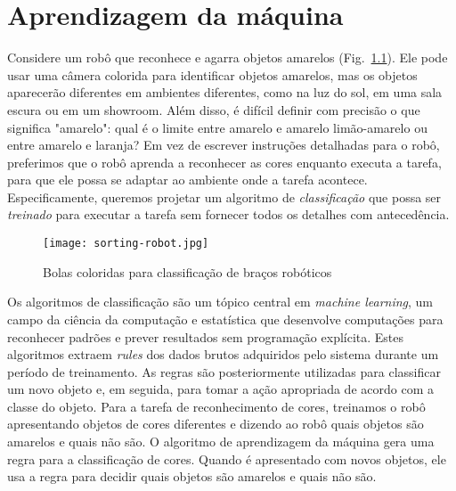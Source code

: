 
\chapter{Aprendizagem da máquina}\label{ch.machine}

Considere um robô que reconhece e agarra objetos amarelos (Fig.~\ref{fig.sortballs}). Ele pode usar uma câmera colorida para identificar objetos amarelos, mas os objetos aparecerão diferentes em ambientes diferentes, como na luz do sol, em uma sala escura ou em um showroom. Além disso, é difícil definir com precisão o que significa "amarelo": qual é o limite entre amarelo e amarelo limão-amarelo ou entre amarelo e laranja? Em vez de escrever instruções detalhadas para o robô, preferimos que o robô aprenda a reconhecer as cores enquanto executa a tarefa, para que ele possa se adaptar ao ambiente onde a tarefa acontece. Especificamente, queremos projetar um algoritmo de \emph{classificação} que possa ser \emph{treinado} para executar a tarefa sem fornecer todos os detalhes com antecedência.

\begin{figure}
\begin{center}
\texttt{[image: sorting-robot.jpg]}
\end{center}
\caption{Bolas coloridas para classificação de braços robóticos}\label{fig.sortballs}
\end{figure}

Os algoritmos de classificação são um tópico central em \emph{machine learning}, um campo da ciência da computação e estatística que desenvolve computações para reconhecer padrões e prever resultados sem programação explícita. Estes algoritmos extraem \emph{rules} dos dados brutos adquiridos pelo sistema durante um período de treinamento. As regras são posteriormente utilizadas para classificar um novo objeto e, em seguida, para tomar a ação apropriada de acordo com a classe do objeto. Para a tarefa de reconhecimento de cores, treinamos o robô apresentando objetos de cores diferentes e dizendo ao robô quais objetos são amarelos e quais não são. O algoritmo de aprendizagem da máquina gera uma regra para a classificação de cores. Quando é apresentado com novos objetos, ele usa a regra para decidir quais objetos são amarelos e quais não são.

